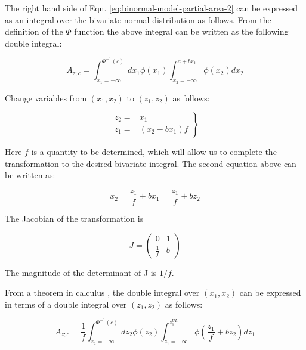 \documentclass[
]{book}
\begin{document}
The right hand side of Eqn. \eqref{eq:binormal-model-partial-area-2} can be expressed as an integral over the bivariate normal distribution as follows. From the definition of the \(\Phi\) function the above integral can be written as the following double integral:

\begin{equation}
A_{z;c} = \int_{x_1=-\infty}^{\Phi^{-1}\left ( c \right )} dx_1 \phi\left ( x_1 \right ) \int_{x_2=-\infty}^{a+bx_1} \phi\left ( x_2 \right ) dx_2
\label{eq:binormal-model-partial-area-double-integral-1}
\end{equation}

Change variables from \((x_1, x_2)\) to \((z_1, z_2)\) as follows:

\begin{equation}
\left. 
\begin{aligned}
z_2= &  x_1 \\
z_1= &  \left ( x_2 - b x_1 \right ) f
\end{aligned}
\right \}
\label{eq:binormal-model-change-variable-2}
\end{equation}

Here \(f\) is a quantity to be determined, which will allow us to complete the transformation to the desired bivariate integral. The second equation above can be written as:

\begin{equation}
x_2= \frac{z_1}{f} + bx_1 = \frac{z_1}{f}  + bz_2
\label{eq:binormal-model-dx2-z1-f}
\end{equation}

The Jacobian \citep{stein1992calculus} of the transformation is

\begin{equation}
J = \left (\begin{matrix}
0 & 1\\ 
\frac{1}{f} & b
\end{matrix}
  \right )\label{eq:binormal-model-jacobian}
\end{equation}

The magnitude of the determinant of J is \(1/f\).

From a theorem in calculus \citep{stein1992calculus}, the double integral over \((x_1,x_2)\) can be expressed in terms of a double integral over \((z_1,z_2)\) as follows:

\begin{equation}
A_{z;c} = \frac{1}{f}\int_{z_2=-\infty}^{\Phi^{-1}\left ( c \right )} dz_2 \phi\left ( z_2 \right ) \int_{z_1=-\infty}^{z_{1}^{UL}} \phi\left ( \frac{z_1}{f} + b z_2\right ) dz_1
\label{eq:binormal-model-partial-area-double-integral-2}
\end{equation}
\end{document}
